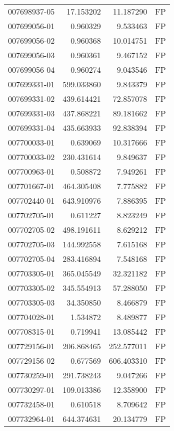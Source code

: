 \begin{tabular}{lrrl}
007698937-05 &   17.153202 &    11.187290 &   FP \\
007699056-01 &    0.960329 &     9.533463 &   FP \\
007699056-02 &    0.960368 &    10.014751 &   FP \\
007699056-03 &    0.960361 &     9.467152 &   FP \\
007699056-04 &    0.960274 &     9.043546 &   FP \\
007699331-01 &  599.033860 &     9.843379 &   FP \\
007699331-02 &  439.614421 &    72.857078 &   FP \\
007699331-03 &  437.868221 &    89.181662 &   FP \\
007699331-04 &  435.663933 &    92.838394 &   FP \\
007700033-01 &    0.639069 &    10.317666 &   FP \\
007700033-02 &  230.431614 &     9.849637 &   FP \\
007700963-01 &    0.508872 &     7.949261 &   FP \\
007701667-01 &  464.305408 &     7.775882 &   FP \\
007702440-01 &  643.910976 &     7.886395 &   FP \\
007702705-01 &    0.611227 &     8.823249 &   FP \\
007702705-02 &  498.191611 &     8.629212 &   FP \\
007702705-03 &  144.992558 &     7.615168 &   FP \\
007702705-04 &  283.416894 &     7.548168 &   FP \\
007703305-01 &  365.045549 &    32.321182 &   FP \\
007703305-02 &  345.554913 &    57.288050 &   FP \\
007703305-03 &   34.350850 &     8.466879 &   FP \\
007704028-01 &    1.534872 &     8.489877 &   FP \\
007708315-01 &    0.719941 &    13.085442 &   FP \\
007729156-01 &  206.868465 &   252.577011 &   FP \\
007729156-02 &    0.677569 &   606.403310 &   FP \\
007730259-01 &  291.738243 &     9.047266 &   FP \\
007730297-01 &  109.013386 &    12.358900 &   FP \\
007732458-01 &    0.610518 &     8.709642 &   FP \\
007732964-01 &  644.374631 &    20.134779 &   FP \\

\end{tabular}
